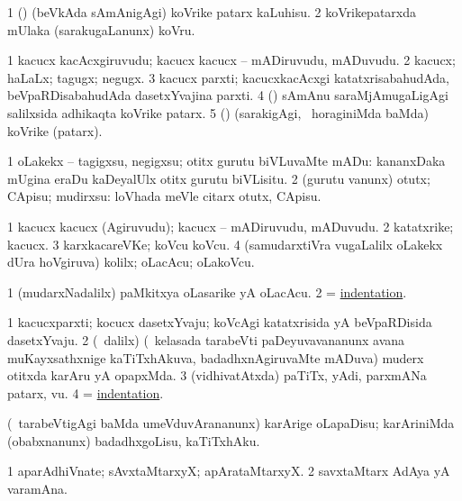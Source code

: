 \noindent
\gl{\akirx}
\bmng
\bnum
\num{1} (\birx) (beVkAda sAmAnigAgi) koVrike patarx kaLuhisu. 
\num{2} koVrikepatarxda mUlaka (sarakugaLanunx) koVru. 
\enum
\emng
\eentry

\bentry
{}
\gl{\nA}
\bmng
\bnum
\num{1} kacucx kacAcxgiruvudu; kacucx kacucx -- mADiruvudu, mADuvudu. 
\num{2} kacucx; haLaLx; tagugx; negugx. 
\num{3} kacucx parxti; kacucxkacAcxgi katatxrisabahudAda, beVpaRDisabahudAda dasetxYvajina parxti. 
\num{4} (\birx) sAmAnu saraMjAmugaLigAgi salilxsida adhikaqta koVrike patarx. 
\num{5} (\birx) (sarakigAgi, \kanmu\ horaginiMda baMda) koVrike (patarx). 
\enum
\emng
\eentry

\bentry
{}
\gl{\sakirx}
\bmng
\bnum
\num{1} oLakekx -- tagigxsu, negigxsu; otitx gurutu biVLuvaMte mADu:  kananxDaka mUgina eraDu kaDeyalUlx otitx gurutu biVLisitu. 
\num{2} (gurutu \mo vanunx) otutx; CApisu; mudirxsu:  loVhada meVle citarx otutx, CApisu. 
\enum
\emng
\eentry

\bentry
{}
\gl{\nA}
\bmng
\bnum
\num{1} kacucx kacucx (Agiruvudu); kacucx -- mADiruvudu, mADuvudu. 
\num{2} katatxrike; kacucx. 
\num{3} karxkacareVKe; koVcu koVcu. 
\num{4} (samudarxtiVra \mo vugaLalilx oLakekx dUra hoVgiruva) kolilx; oLacAcu; oLakoVcu. 
\enum
\emng
\eentry

\bentry
{}
\gl{\nA}
\bmng
\bnum
\num{1} (mudarxNadalilx) paMkitxya oLasarike yA oLacAcu. 
\num{2} = \hyperlink{indentation}{indentation}. 
\enum
\emng
\eentry

\bentry
{}
\gl{\nA}
\bmng
\bnum
\num{1} kacucxparxti; kocucx dasetxYvaju; koVcAgi katatxrisida yA beVpaRDisida dasetxYvaju. 
\num{2} (\sA\ \bava dalilx) (\kanmu\ kelasada tarabeVti paDeyuvavananunx avana muKayxsathxnige kaTiTxhAkuva, badadhxnAgiruvaMte mADuva) muderx otitxda karAru yA opapxMda. 
\num{3} (vidhivatAtxda) paTiTx, yAdi, parxmANa patarx, \mo vu. 
\num{4}  = \hyperlink{indentation}{indentation}. 
\enum
\emng
\eentry

\bentry
{}
\gl{\sakirx}
\bmng
(\kanmu\ tarabeVtigAgi baMda umeVduvArananunx) karArige oLapaDisu; karAriniMda (obabxnanunx) badadhxgoLisu, kaTiTxhAku. 
\emng
\eentry

\bentry
{}
\gl{\nA}
\bmng
\bnum
\num{1} aparAdhiVnate; sAvxtaMtarxyX; apArataMtarxyX. 
\num{2} savxtaMtarx AdAya yA varamAna. 
\enum
\emng
\eentry

